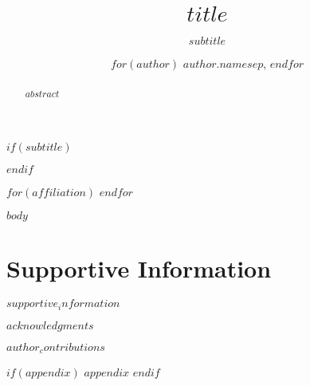 \documentclass[$class_option$]{stjour}
\begin{document}
\title[$shorttitle$]{$title$}
$if(subtitle)$
\subtitle{$subtitle$}
$endif$

\author[$for(author)$$author.name$$sep$, $endfor$]{
  $for(author)$
    $author.name$$sep$,
  $endfor$
}

$for(affiliation)$
$endfor$



\begin{abstract}
$abstract$
\end{abstract}

$body$


\section{Supportive Information}
$supportive_information$

\acknowledgments
$acknowledgments$

\authorcontributions
$author_contributions$



$if(appendix)$
  \appendix
  $appendix$
$endif$
\end{document}
